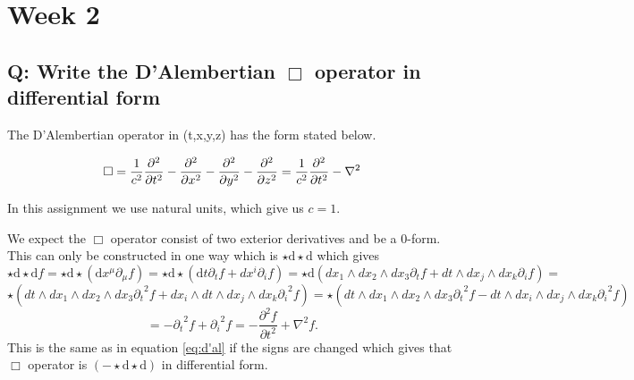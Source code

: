 \section{Week 2}
\subsection{Q: Write the D'Alembertian $\Box$ operator in differential form}

The  D'Alembertian operator in (t,x,y,z) has the form stated below.

\begin{equation}
\Box=\frac{1}{c^{2}} \frac{\partial^2}{\partial t^2} - \frac{\partial^2}{\partial x^2} - \frac{\partial^2}{\partial y^2} - \frac{\partial^2}{\partial z^2}=   \frac{1}{c^2} {\partial^2 \over \partial t^2} - \nabla^2
\label{eq:d'al}
\end{equation}



In this assignment we use natural units, which give us $c=1$.

We expect the $\Box$ operator consist of two exterior derivatives and be a $0$-form. 
This can only be constructed in one way which is $\star \mathrm{d} \star \mathrm{d}$ which gives
\[
\star \mathrm{d} \star \mathrm{d} f=\star \mathrm{d} \star(\mathrm{d}x^{\mu} \partial_\mu f)=\star \mathrm{d} \star(\mathrm{d}t \partial_t f + dx^i \partial_i f)=\star \mathrm{d}(dx_1\wedge dx_2 \wedge dx_3 \partial_t f+ dt\wedge dx_j \wedge dx_k \partial_i f)=\]
\[ \star(dt\wedge dx_1\wedge dx_2 \wedge dx_3 {\partial_t}^2 f+ dx_i\wedge dt\wedge dx_j \wedge dx_k {\partial_i}^2 f)=\star(dt\wedge dx_1\wedge dx_2 \wedge dx_3 {\partial_t}^2 f- dt\wedge dx_i\wedge dx_j \wedge dx_k {\partial_i}^2 f)
\]
\[=-{\partial_t}^2 f+{\partial_i}^2 f=-\frac{\partial^2 f}  {\partial t^2} + \nabla^2 f.
\]
This is the same as in equation \ref{eq:d'al} if the signs are changed which gives that $\Box$ operator is $(-\star \mathrm{d} \star \mathrm{d})$ in differential form. 





